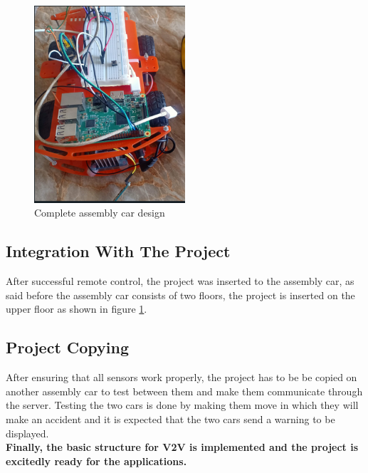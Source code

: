 \begin{figure}
    \includegraphics[width=0.5\textwidth]{figures/9_16.PNG}
    \caption{Complete assembly car design}
    \label{fig:complete-assembly}
\end{figure}
\subsection{Integration With The Project}
After successful remote control, the project was inserted to the assembly car, as said before the assembly car consists of two floors, the project is inserted on the upper floor as shown in figure \ref{fig:complete-assembly}.

\subsection{Project Copying}
After ensuring that all sensors work properly, the project has to be be copied on another assembly car to test between them and make them communicate through the server. Testing the two cars is done by making them move in which they will make an accident and it is expected that the two cars send a warning to be displayed. \\

\textbf{Finally, the basic structure for V2V is implemented and the project is excitedly ready for the applications. } 